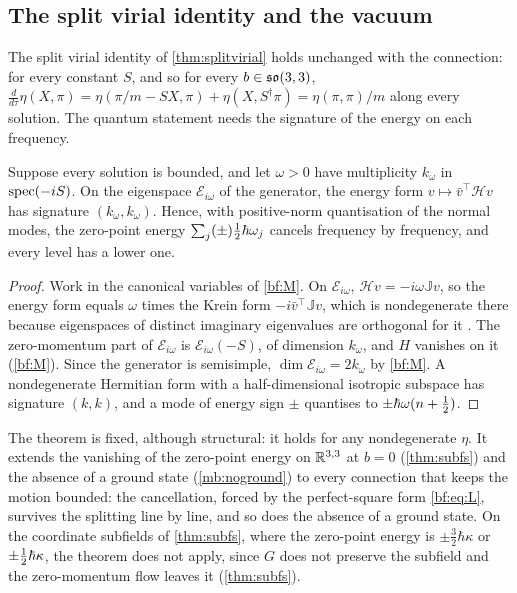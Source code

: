 \subsection{The split virial identity and the vacuum}
\label{sec:bf-vacuum}

The split virial identity of \cref{thm:splitvirial} holds unchanged with the connection: for every constant $S$, and so for every
$b\in\mathfrak{so}(3,3)$, $\tfrac d{d\tau}\eta(X,\pi)=\eta(\pi/m-SX,\pi)+\eta(X,S^\dagger\pi)=\eta(\pi,\pi)/m$ along every solution. The quantum statement
needs the signature of the energy on each frequency.

\begin{theorem}
\label{bf:krein}
Suppose every solution is bounded, and let $\omega>0$ have multiplicity $k_\omega$ in $\operatorname{spec}(-iS)$. On the eigenspace $\mathcal E_{i\omega}$ of the
generator, the energy form $v\mapsto\bar v^{\!\top}\mathcal Hv$ has signature $(k_\omega,k_\omega)$. Hence, with positive-norm quantisation of the normal
modes, the zero-point energy $\sum_j(\pm)\tfrac12\hbar\omega_j$ cancels frequency by frequency, and every level has a lower one.
\end{theorem}

\begin{proof}
Work in the canonical variables of \cref{bf:M}. On $\mathcal E_{i\omega}$, $\mathcal Hv=-i\omega\mathbb Jv$, so the energy form equals $\omega$ times the
Krein form $-i\bar v^{\!\top}\mathbb Jv$, which is nondegenerate there because eigenspaces of distinct imaginary eigenvalues are orthogonal for it
\cite{YakubovichStarzhinskii75}. The zero-momentum part of $\mathcal E_{i\omega}$ is $\mathcal E_{i\omega}(-S)$, of dimension $k_\omega$, and $H$ vanishes on
it (\cref{bf:M}). Since the generator is semisimple, $\dim\mathcal E_{i\omega}=2k_\omega$ by \cref{bf:M}. A nondegenerate Hermitian form with a
half-dimensional isotropic subspace has signature $(k,k)$, and a mode of energy sign $\pm$ quantises to $\pm\hbar\omega(n+\tfrac12)$.
\end{proof}

The theorem is fixed, although structural: it holds for any nondegenerate $\eta$. It extends the vanishing of the zero-point energy on
$\mathbb{R}^{3,3}$ at $b=0$ (\cref{thm:subfs}) and the absence of a ground state (\cref{mb:noground}) to every connection that keeps the motion bounded: the
cancellation, forced by the perfect-square form \eqref{bf:eq:L}, survives the splitting line by line, and so does the absence of a ground state.
On the coordinate subfields of \cref{thm:subfs}, where the zero-point energy is $\pm\tfrac32\hbar\kappa$ or $\pm\tfrac12\hbar\kappa$, the theorem does not
apply, since $G$ does not preserve the subfield and the zero-momentum flow leaves it (\cref{thm:subfs}).

